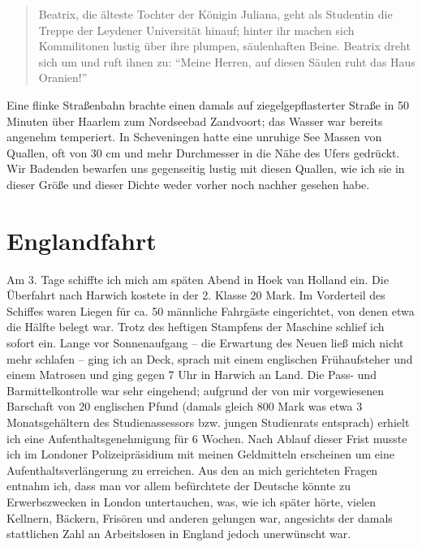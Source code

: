 \documentclass[a5paper,pagesize,10pt,twoside=true]{scrbook}
\begin{document}
\begin{quote}
	Beatrix, die älteste Tochter der Königin Juliana, geht als Studentin die Treppe der Leydener Universität hinauf; hinter ihr machen sich Kommilitonen lustig über ihre plumpen, säulenhaften Beine. Beatrix dreht sich um und ruft ihnen zu: \enquote{Meine Herren, auf diesen Säulen ruht das Haus Oranien!}
\end{quote}

Eine flinke Straßenbahn brachte einen damals auf ziegelgepflasterter Straße in 50 Minuten über Haarlem zum Nordseebad Zandvoort; das Wasser war bereits angenehm temperiert. In Scheveningen hatte eine unruhige See Massen von Quallen, oft von 30 cm und mehr Durchmesser in die Nähe des Ufers gedrückt. Wir Badenden bewarfen uns gegenseitig lustig mit diesen Quallen, wie ich sie in dieser Größe und dieser Dichte weder vorher noch nachher gesehen habe.



\section{Englandfahrt}
Am 3. Tage schiffte ich mich am späten Abend in Hoek van Holland ein. Die Überfahrt nach Harwich kostete in der 2. Klasse 20 Mark. Im Vorderteil des Schiffes waren Liegen für ca. 50 männliche Fahrgäste eingerichtet, von denen etwa die Hälfte belegt war. Trotz des heftigen Stampfens der Maschine schlief ich sofort ein. Lange vor Sonnenaufgang -- die Erwartung des Neuen ließ mich nicht mehr schlafen -- ging ich an Deck, sprach mit einem englischen Frühaufsteher und einem Matrosen und ging gegen 7 Uhr in Harwich an Land. Die Pass- und Barmittelkontrolle war sehr eingehend; aufgrund der von mir vorgewiesenen Barschaft von 20 englischen Pfund (damals gleich 800 Mark was etwa 3 Monatsgehältern des Studienassessors bzw. jungen Studienrats entsprach) erhielt ich eine Aufenthaltsgenehmigung für 6 Wochen. Nach Ablauf dieser Frist musste ich im Londoner Polizeipräsidium mit meinen Geldmitteln erscheinen um eine Aufenthaltsverlängerung zu erreichen. Aus den an mich gerichteten Fragen entnahm ich, dass man vor allem befürchtete der Deutsche könnte zu Erwerbszwecken in London untertauchen, was, wie ich später hörte, vielen Kellnern, Bäckern, Frisören und anderen gelungen war, angesichts der damals stattlichen Zahl an Arbeitslosen in England jedoch unerwünscht war.
\end{document}
